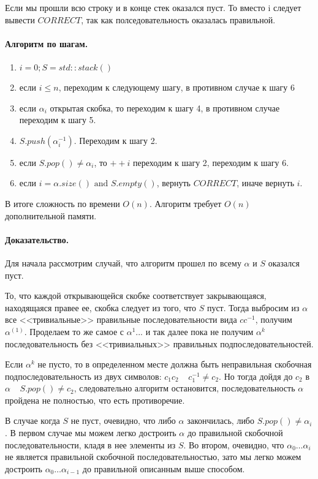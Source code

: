 \documentclass[12pt]{article}
\begin{document}
Если мы прошли всю строку и в конце стек оказался пуст. То вместо i следует вывести $ CORRECT $, так как полседовательность оказалась правильной.


\paragraph{Алгоритм по шагам.}
\begin{enumerate}
    \item $i = 0; S = std::stack() $
    \item если $ i \le n $, переходим к следующему шагу, в противном случае к шагу 6
    \item если $ \alpha_i $ открытая скобка, то переходим к шагу 4, в противном случае переходим к шагу 5.
    \item $ S.push(\alpha_i^{-1}) $. Переходим к шагу 2.
    \item если $ S.pop() \ne \alpha_i $, то $ ++i $ переходим к шагу 2, переходим к шагу 6.
    \item если $ i = \alpha.size() \mbox{ and } S.empty() $, вернуть $ CORRECT $, иначе вернуть $ i $.
\end{enumerate}

В итоге сложность по времени $O(n)$. Алгоритм требует $O(n)$ дополнительной памяти.


\paragraph{Доказательство.}
Для начала рассмотрим случай, что алгоритм прошел по всему $ \alpha $ и $ S $ оказался пуст.

То, что каждой открывающейся скобке соответствует закрывающаяся, находящаяся правее ее, скобка следует
из того, что $ S $ пуст. Тогда выбросим из $ \alpha $ все <<тривиальные>> правильные последовательности вида
$cc^{-1}$, получим $ \alpha^{(1)} $. 
Проделаем то же самое с $ \alpha^{1} $... и так далее пока не получим
$ \alpha^{k} $ последовательность без <<тривиальных>> правильных подпоследовательностей. 

Если $ \alpha^{k} $ не пусто, то в определенном месте должна быть неправильная скобочная подпоследовательность из двух символов:
$ c_1c_2 \;\;\;\; c_1^{-1} \ne c_2 $. Но тогда дойдя до $ c_2 $ в $ \alpha \;\;\;\; S.pop() \ne c_2 $, следовательно
алгоритм остановится, последовательность $ \alpha $ пройдена не полностью, что есть противоречие.

В случае когда $ S $ не пуст, очевидно, что либо $ \alpha $ закончилась, либо $ S.pop() \ne \alpha_i $. В первом случае
мы можем легко достроить $ \alpha $ до правильной скобочной последовательности, кладя в нее элементы из $ S $. Во втором,
очевидно, что $ \alpha_0\dots \alpha_i $ не является правильной скобочной последовательностью, зато мы легко можем
достроить $ \alpha_0\dots \alpha_{i-1} $ до правильной описанным выше способом. 
\end{document}
